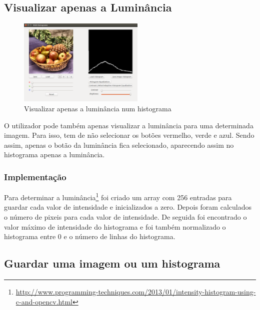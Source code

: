 \documentclass[pdftex,12pt,a4paper]{report}
\begin{document}
\subsection{Visualizar apenas a Luminância}

\begin{figure}[!htb]
\center
 \includegraphics[width=60mm,scale=1]{imagens/only_brightness.png}
 \caption{Visualizar apenas a luminância num histograma}
\end{figure}

O utilizador pode também apenas visualizar a luminância para uma determinada imagem. Para isso, tem de não selecionar os botões vermelho, verde e azul. Sendo assim, apenas o botão da luminância fica selecionado, aparecendo assim no histograma apenas a luminância.

\subsubsection{Implementação}
Para determinar a luminância\footnote{\label{url3} \url{http://www.programming-techniques.com/2013/01/intensity-histogram-using-c-and-opencv.html}} foi criado um array com 256 entradas para guardar cada valor de intensidade e inicializados a zero. Depois foram calculados o número de pixeis para cada valor de intensidade. De seguida foi encontrado o valor máximo de intensidade do histograma e foi também normalizado o histograma entre 0 e o número de linhas do histograma.

\subsection{Guardar uma imagem ou um histograma}
\end{document}
